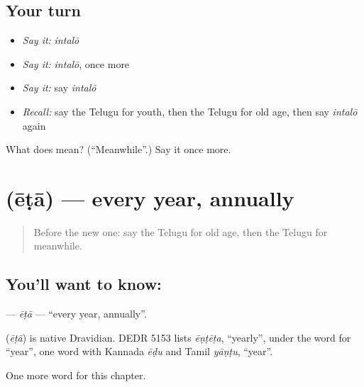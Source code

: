 \subsection*{Your turn}
\begin{itemize}
\raggedright
  \item \emph{Say it:} \emph{intalō}
  \item \emph{Say it:} \emph{intalō}, once more
  \item \emph{Say it:} say \emph{intalō}
  \item \emph{Recall:} say the Telugu for youth, then the Telugu for old age, then say \emph{intalō} again
\end{itemize}

\begin{tcolorbox}[breakable,colback=teal!4,colframe=teal!35!black,title={Before you move on}]
What does  mean? (\textquotedblleft{}Meanwhile\textquotedblright{}.) Say it once more.
\end{tcolorbox}
\section[\texorpdfstring{\te{ఏటా} (ēṭā)}{ఏటా (ēṭā)}]{ (ēṭā) — every year, annually}

\label{lesson:TE-C172-eta}



\begin{quote}
Before the new one: say the Telugu for old age, then the Telugu for meanwhile.
\end{quote}

\subsection*{You'll want to know: }
\textbf{} — \emph{ēṭā} — \textquotedblleft{}every year, annually\textquotedblright{}.

\begin{cousinweb}
\textbf{} (\emph{ēṭā}) is native Dravidian. DEDR 5153 lists \emph{ēṇṭēṭa}, \textquotedblleft{}yearly\textquotedblright{}, under the word for \textquotedblleft{}year\textquotedblright{}, one word with Kannada \emph{ēḍu} and Tamil \emph{yāṇṭu}, \textquotedblleft{}year\textquotedblright{}.
\end{cousinweb}

\begin{grammarlens}[title={What you've built}]
One more word for this chapter.
\end{grammarlens}

